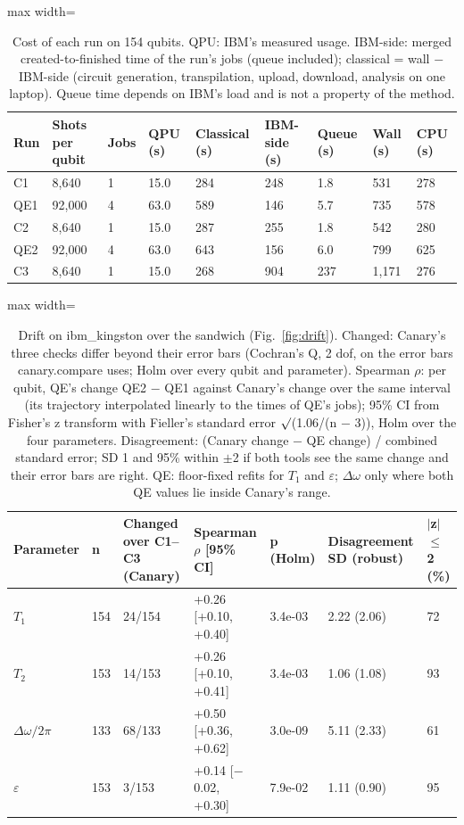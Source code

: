\begin{table}[!t]
\centering
\footnotesize
\caption{Cost of each run on 154 qubits. QPU: IBM's measured usage. IBM-side: merged created-to-finished time of the run's jobs (queue included); classical = wall $-$ IBM-side (circuit generation, transpilation, upload, download, analysis on one laptop). Queue time depends on IBM's load and is not a property of the method.}
\label{tab:h6}
\begin{adjustbox}{max width=\linewidth}
\begin{tabular}{lllllllll}
\hline
Run & Shots per qubit & Jobs & QPU (s) & Classical (s) & IBM-side (s) & Queue (s) & Wall (s) & CPU (s) \\
\hline
C1 & 8,640 & 1 & 15.0 & 284 & 248 & 1.8 & 531 & 278 \\
QE1 & 92,000 & 4 & 63.0 & 589 & 146 & 5.7 & 735 & 578 \\
C2 & 8,640 & 1 & 15.0 & 287 & 255 & 1.8 & 542 & 280 \\
QE2 & 92,000 & 4 & 63.0 & 643 & 156 & 6.0 & 799 & 625 \\
C3 & 8,640 & 1 & 15.0 & 268 & 904 & 237 & 1,171 & 276 \\
\hline
\end{tabular}
\end{adjustbox}
\end{table}

\begin{table}[!t]
\centering
\footnotesize
\caption{Drift on ibm\_kingston over the sandwich (Fig.~\ref{fig:drift}). Changed: Canary's three checks differ beyond their error bars (Cochran's Q, 2 dof, on the error bars canary.compare uses; Holm over every qubit and parameter). Spearman $\rho$: per qubit, QE's change QE2 $-$ QE1 against Canary's change over the same interval (its trajectory interpolated linearly to the times of QE's jobs); 95\% CI from Fisher's z transform with Fieller's standard error $\surd$(1.06/(n $-$ 3)), Holm over the four parameters. Disagreement: (Canary change $-$ QE change) / combined standard error; SD 1 and 95\% within $\pm$2 if both tools see the same change and their error bars are right. QE: floor-fixed refits for $T_1$ and $\varepsilon$; $\Delta\omega$ only where both QE values lie inside Canary's range.}
\label{tab:h7}
\begin{adjustbox}{max width=\linewidth}
\begin{tabular}{lllllll}
\hline
Parameter & n & Changed over C1--C3 (Canary) & Spearman $\rho$ [95\% CI] & p (Holm) & Disagreement SD (robust) & $|$z$|$ $\leq$ 2 (\%) \\
\hline
$T_1$ & 154 & 24/154 & +0.26 [+0.10, +0.40] & 3.4e-03 & 2.22 (2.06) & 72 \\
$T_2$ & 153 & 14/153 & +0.26 [+0.10, +0.41] & 3.4e-03 & 1.06 (1.08) & 93 \\
$\Delta\omega/2\pi$ & 133 & 68/133 & +0.50 [+0.36, +0.62] & 3.0e-09 & 5.11 (2.33) & 61 \\
$\varepsilon$ & 153 & 3/153 & +0.14 [$-$0.02, +0.30] & 7.9e-02 & 1.11 (0.90) & 95 \\
\hline
\end{tabular}
\end{adjustbox}
\end{table}

